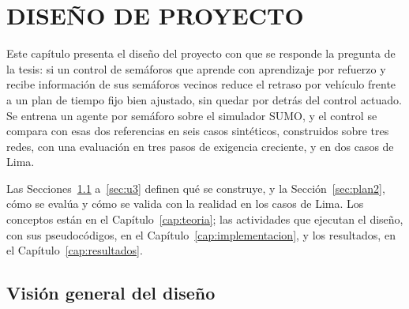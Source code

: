 \chapter{DISEÑO DE PROYECTO}
\label{cap:metodologia}

Este capítulo presenta el diseño del proyecto con que se responde la
pregunta de la tesis: si un control de semáforos que aprende con aprendizaje por
refuerzo y recibe información de sus semáforos vecinos reduce el
retraso por vehículo frente a un plan de tiempo fijo bien ajustado, sin
quedar por detrás del control actuado. Se entrena un agente por
semáforo sobre el simulador SUMO, y el control se compara con esas dos
referencias en seis casos sintéticos, construidos sobre tres redes, con
una evaluación en tres pasos de exigencia creciente, y en dos casos de
Lima.

Las Secciones~\ref{sec:vision-general} a~\ref{sec:u3} definen qué se
construye, y la Sección~\ref{sec:plan2}, cómo se evalúa y cómo se
valida con la realidad en los casos de Lima. Los conceptos están en el
Capítulo~\ref{cap:teoria}; las actividades que ejecutan el diseño, con
sus pseudocódigos, en el Capítulo~\ref{cap:implementacion}, y los
resultados, en el Capítulo~\ref{cap:resultados}.


\section{Visión general del diseño}
\label{sec:vision-general}

